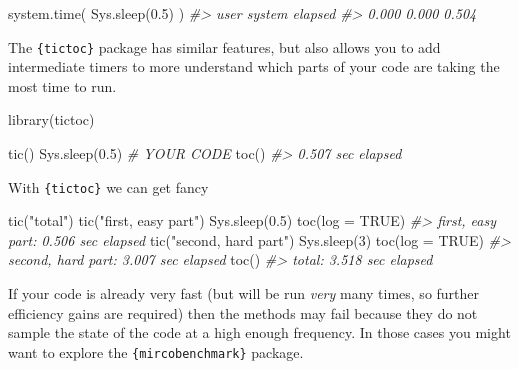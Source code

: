 \documentclass[
  12pt,
]{book}
\newenvironment{Shaded}{\begin{snugshade}}{\end{snugshade}}
\newcommand{\AttributeTok}[1]{\textcolor[rgb]{0.77,0.63,0.00}{#1}}
\newcommand{\CommentTok}[1]{\textcolor[rgb]{0.56,0.35,0.01}{\textit{#1}}}
\newcommand{\ConstantTok}[1]{\textcolor[rgb]{0.00,0.00,0.00}{#1}}
\newcommand{\DecValTok}[1]{\textcolor[rgb]{0.00,0.00,0.81}{#1}}
\newcommand{\FloatTok}[1]{\textcolor[rgb]{0.00,0.00,0.81}{#1}}
\newcommand{\FunctionTok}[1]{\textcolor[rgb]{0.00,0.00,0.00}{#1}}
\newcommand{\NormalTok}[1]{#1}
\newcommand{\StringTok}[1]{\textcolor[rgb]{0.31,0.60,0.02}{#1}}
\begin{document}
\begin{Shaded}
\begin{Highlighting}[]
\FunctionTok{system.time}\NormalTok{(}
  \FunctionTok{Sys.sleep}\NormalTok{(}\FloatTok{0.5}\NormalTok{)}
\NormalTok{)}
\CommentTok{\#\textgreater{}    user  system elapsed }
\CommentTok{\#\textgreater{}   0.000   0.000   0.504}
\end{Highlighting}
\end{Shaded}

The \texttt{\{tictoc\}} package has similar features, but also allows you to add intermediate timers to more understand which parts of your code are taking the most time to run.

\begin{Shaded}
\begin{Highlighting}[]
\FunctionTok{library}\NormalTok{(tictoc)}

\FunctionTok{tic}\NormalTok{() }
\FunctionTok{Sys.sleep}\NormalTok{(}\FloatTok{0.5}\NormalTok{) }\CommentTok{\# YOUR CODE }
\FunctionTok{toc}\NormalTok{()}
\CommentTok{\#\textgreater{} 0.507 sec elapsed}
\end{Highlighting}
\end{Shaded}

With \texttt{\{tictoc\}} we can get fancy

\begin{Shaded}
\begin{Highlighting}[]
\FunctionTok{tic}\NormalTok{(}\StringTok{"total"}\NormalTok{)}
\FunctionTok{tic}\NormalTok{(}\StringTok{"first, easy part"}\NormalTok{)}
\FunctionTok{Sys.sleep}\NormalTok{(}\FloatTok{0.5}\NormalTok{)}
\FunctionTok{toc}\NormalTok{(}\AttributeTok{log =} \ConstantTok{TRUE}\NormalTok{)}
\CommentTok{\#\textgreater{} first, easy part: 0.506 sec elapsed}
\FunctionTok{tic}\NormalTok{(}\StringTok{"second, hard part"}\NormalTok{)}
\FunctionTok{Sys.sleep}\NormalTok{(}\DecValTok{3}\NormalTok{)}
\FunctionTok{toc}\NormalTok{(}\AttributeTok{log =} \ConstantTok{TRUE}\NormalTok{)}
\CommentTok{\#\textgreater{} second, hard part: 3.007 sec elapsed}
\FunctionTok{toc}\NormalTok{()}
\CommentTok{\#\textgreater{} total: 3.518 sec elapsed}
\end{Highlighting}
\end{Shaded}

If your code is already very fast (but will be run \emph{very} many times, so further efficiency gains are required) then the methods may fail because they do not sample the state of the code at a high enough frequency. In those cases you might want to explore the \texttt{\{mircobenchmark\}} package.
\end{document}
